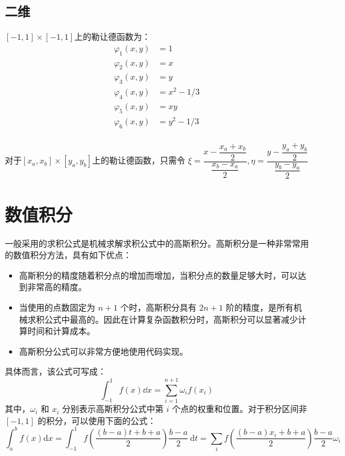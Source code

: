 \documentclass{article}
\numberwithin{equation}{subsection}    %
\begin{document}
\begin{appendix}
    \subsection{二维}
    $[-1,1]\times[-1,1]$上的勒让德函数为：
    \begin{equation}
        \begin{aligned}
            \varphi_{1}(x,y) & = 1       \\
            \varphi_{2}(x,y) & = x       \\
            \varphi_{3}(x,y) & = y       \\
            \varphi_{4}(x,y) & = x^2-1/3 \\
            \varphi_{5}(x,y) & = xy      \\
            \varphi_{6}(x,y) & = y^2-1/3 \\
        \end{aligned}
    \end{equation}

    对于$[x_a,x_b]\times[y_a,y_b]$上的勒让德函数，只需令 $\xi=\dfrac{x - \dfrac{x_a+x_b}{2}}{\dfrac{x_b-x_a}{2}},\eta = \dfrac{y - \dfrac{y_a+y_b}{2}}{\dfrac{y_b-y_a}{2}}$
    \section{数值积分}
    一般采用的求积公式是机械求解求积公式中的高斯积分。高斯积分是一种非常常用的数值积分方法，具有如下优点：
    \begin{itemize}
        \item 高斯积分的精度随着积分点的增加而增加，当积分点的数量足够大时，可以达到非常高的精度。
        \item 当使用的点数固定为 $n+1$ 个时，高斯积分具有 $2n+1$ 阶的精度，是所有机械求积公式中最高的。因此在计算复杂函数积分时，高斯积分可以显著减少计算时间和计算成本。
        \item 高斯积分公式可以非常方便地使用代码实现。
    \end{itemize}
    具体而言，该公式可写成：
    \begin{equation}
        \int_{-1}^1 f(x)\dd x=\sum_{i=1}^{n+1}\omega_if(x_i)
    \end{equation}
    其中，$\omega_i$ 和 $x_i$ 分别表示高斯积分公式中第 $i$ 个点的权重和位置。对于积分区间非 $[-1,1]$ 的积分，可以使用下面的公式：
    \begin{equation}
        \int_{a}^{b} f(x) \mathrm{d} x=\int_{-1}^{1} f\left(\frac{(b-a) t+b+a}{2}\right) \frac{b-a}{2} \mathrm{~d} t=\sum_i f(\frac{(b-a)x_i+b+a}{2})\frac{b-a}{2}\omega_i
    \end{equation}


\end{appendix}
\end{document}
